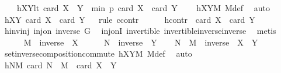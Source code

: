 \begin{isabellebody}
\ \ \ \ hXYlt{\isacharcolon}{\kern0pt}\ {\isachardoublequoteopen}card\ {\isacharparenleft}{\kern0pt}X\ {\isasymcdots}\ Y{\isacharparenright}{\kern0pt}\ {\isacharless}{\kern0pt}\ min\ p\ {\isacharparenleft}{\kern0pt}card\ X\ {\isacharplus}{\kern0pt}\ card\ Y\ {\isacharminus}{\kern0pt}\ {}{\isacharparenright}{\kern0pt}{\isachardoublequoteclose}\ \isamarkupfalse%
\ hXYM\ M{\isacharunderscore}{\kern0pt}def\ \isamarkupfalse%
\ auto\isanewline
\ \ \isamarkupfalse%
\ hXY{\isacharcolon}{\kern0pt}\ {\isachardoublequoteopen}card\ X\ {\isasymle}\ card\ Y{\isachardoublequoteclose}\isanewline
\ \ \isamarkupfalse%
{\isacharparenleft}{\kern0pt}rule\ ccontr{\isacharparenright}{\kern0pt}\isanewline
\ \ \ \ \isamarkupfalse%
\ hcontr{\isacharcolon}{\kern0pt}\ {\isachardoublequoteopen}{\isasymnot}\ card\ X\ {\isasymle}\ card\ Y{\isachardoublequoteclose}\isanewline
\ \ \ \ \isamarkupfalse%
\ hinvinj{\isacharcolon}{\kern0pt}\ {\isachardoublequoteopen}inj{\isacharunderscore}{\kern0pt}on\ inverse\ G{\isachardoublequoteclose}\ \isamarkupfalse%
\ inj{\isacharunderscore}{\kern0pt}onI\ invertible\ invertible{\isacharunderscore}{\kern0pt}inverse{\isacharunderscore}{\kern0pt}inverse\ \isamarkupfalse%
\ metis\isanewline
\ \ \ \ \isamarkupfalse%
\ {\isacharquery}{\kern0pt}M\ {\isacharequal}{\kern0pt}\ {\isachardoublequoteopen}inverse\ {\isacharbackquote}{\kern0pt}\ X{\isachardoublequoteclose}\isanewline
\ \ \ \ \isamarkupfalse%
\ {\isacharquery}{\kern0pt}N\ {\isacharequal}{\kern0pt}\ {\isachardoublequoteopen}inverse\ {\isacharbackquote}{\kern0pt}\ Y{\isachardoublequoteclose}\isanewline
\ \ \isamarkupfalse%
\ {\isachardoublequoteopen}{\isacharquery}{\kern0pt}N\ {\isasymcdots}\ {\isacharquery}{\kern0pt}M\ {\isacharequal}{\kern0pt}\ inverse\ {\isacharbackquote}{\kern0pt}\ {\isacharparenleft}{\kern0pt}X\ {\isasymcdots}\ Y{\isacharparenright}{\kern0pt}{\isachardoublequoteclose}\ \isamarkupfalse%
\ set{\isacharunderscore}{\kern0pt}inverse{\isacharunderscore}{\kern0pt}composition{\isacharunderscore}{\kern0pt}commute\ hXYM\ M{\isacharunderscore}{\kern0pt}def\ \isamarkupfalse%
\ auto\isanewline
\ \ \isamarkupfalse%
\ \isamarkupfalse%
\ hNM{\isacharcolon}{\kern0pt}\ {\isachardoublequoteopen}card\ {\isacharparenleft}{\kern0pt}{\isacharquery}{\kern0pt}N\ {\isasymcdots}\ {\isacharquery}{\kern0pt}M{\isacharparenright}{\kern0pt}\ {\isacharequal}{\kern0pt}\ card\ {\isacharparenleft}{\kern0pt}X\ {\isasymcdots}\ Y{\isacharparenright}{\kern0pt}{\isachardoublequoteclose}\ \isanewline

\end{isabellebody}
